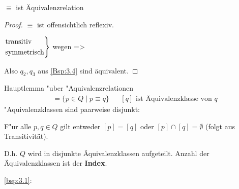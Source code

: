\begin{lemma}[name={[$\equiv$ ist Äquivalenzrelation]}] %
	$\equiv$ ist Äquivalenzrelation\\
\end{lemma}
\begin{proof} $\equiv$ ist offensichtlich reflexiv.
	
	$\begin{rcases}
	\text{transitiv}\\
	\text{symmetrisch}
	\end{rcases}$ wegen \<=>
	
	Also $q_2,q_3$ aus \autoref{Bsp:3.4} sind äquivalent.
\end{proof}
\begin{Erinnerung}
Hauptlemma "uber "Aquivalenzrelationen
\begin{align*}
	[q] &= \{p\in Q \mid p \equiv q\} &&[q] \text{ ist Äquivalenzklasse von }q
\end{align*}
"Aquivalenzklassen sind paarweise disjunkt:

F"ur alle $ p,q\in Q$ gilt entweder $[p]=[q]$ oder $[p]\cap[q] = \emptyset$ (folgt aus Transitivität).

D.h. $Q$ wird in disjunkte Äquivalenzklassen aufgeteilt. Anzahl der Äquivalenzklassen ist der \textbf{Index}.
\end{Erinnerung}

\eqref{bsp:3.1}:
\begin{minipage}{.5\textwidth}
    \captionsetup{type=figure}
\end{minipage}

